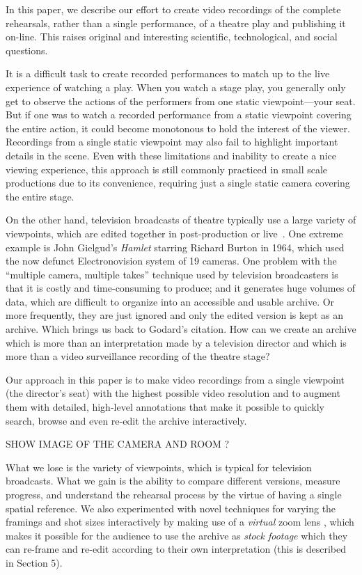 \documentclass[conference]{IEEEtran}
\begin{document}
In this paper, we describe our effort to create video recordings of the complete rehearsals,
rather than a single performance, of a theatre play and publishing it on-line. This raises original
and interesting scientific, technological, and social questions.

It is a difficult task to create recorded performances to match up to the live experience
of watching a play. When you watch a stage play, you generally only get to observe the actions 
of the performers from one static viewpoint---your seat. But if one was to watch a recorded 
performance from a static viewpoint covering the entire action, it could become monotonous 
to hold the interest of the viewer. Recordings from a single static viewpoint may also fail to 
highlight important details in the scene. Even with these limitations and inability to create a nice 
viewing experience, this approach is still commonly practiced in small scale productions due to 
its convenience, requiring just a single static camera covering the entire stage. 


On the other hand, television broadcasts of theatre typically use a large variety of viewpoints, which are edited together
in post-production or live~\cite{bouchez2007filmer}. One extreme example is John Gielgud's 
\emph{Hamlet} starring Richard Burton in 1964, which used  the now defunct Electronovision system of 19 cameras. 
One problem with the ``multiple camera, multiple takes'' technique used by television broadcasters 
is that it is costly and time-consuming to produce; and it generates huge volumes of data, which are 
difficult to organize into an accessible and usable archive. Or more frequently, they are just ignored
and only the edited version is kept as an archive. Which brings us back to Godard's citation. How can we create 
an archive which is  more than an interpretation made by a television director and which is more than a video surveillance recording of the theatre stage? 

Our approach in this paper is to make video recordings from a single viewpoint (the director's seat) with the highest possible
video resolution and to augment them with detailed, high-level  annotations that make it possible to quickly  search, browse
and even re-edit the archive interactively. 


SHOW IMAGE OF THE CAMERA AND ROOM ?

What we lose is the variety of viewpoints, which is typical for television broadcasts. What we gain is the ability to compare
different versions, measure progress, and understand the rehearsal process by the virtue of having a single spatial reference.
We also experimented with novel techniques for varying the framings and shot sizes interactively 
by making use of a {\em virtual}  zoom lens \cite{Gandhi14}, which makes it possible for the audience to
use the archive as {\em stock footage} which they can re-frame and re-edit according to their own interpretation (this is described in Section 5). 
\end{document}
